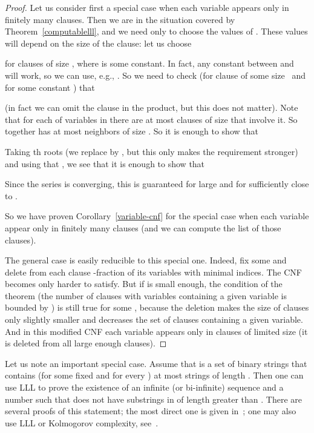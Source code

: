 \documentclass[12pt]{article}
\begin{document}
\begin{proof} Let us consider first a special case when each variable appears
only in finitely many clauses. Then we are in the situation covered by
Theorem~\ref{computablelll}, and we need only to choose the values of .
These values will depend on the size of the clause: let us choose
  
for clauses of size , where  is some constant. In fact, any constant
between  and  will work, so we can use, e.g., .
So we need to check (for clause  of some size~ and for some constant ) that
  
(in fact we can omit the clause  in the product, but this does not matter).
Note that for each of  variables in  there are at most 
clauses of size  that involve it. So together  has at most 
neighbors of size . So it is enough to show that
  
Taking th roots (we replace  by , but this only makes the requirement stronger) and using that , we see that it is enough
to show that
  
Since the series  is converging, this is
guaranteed for large  and for  sufficiently close to .

So we have proven Corollary~\ref{variable-cnf} for the special case when
each variable appear only in finitely many clauses (and we can compute
the list of those clauses).

The general case is easily reducible to this special one. Indeed, fix some  and delete from each clause -fraction of its variables with minimal indices. The CNF becomes only harder to satisfy. But if  is small enough, the condition of the theorem (the number of clauses with  variables containing a given variable is bounded by ) is still true for some , because the deletion makes the size of clauses only slightly smaller and decreases the set of clauses containing a given variable. And in this modified CNF each variable appears only in clauses of limited size (it is deleted from all large enough clauses).
\end{proof}

Let us note an important special case. Assume that  is a set of binary strings that contains (for some fixed  and for every ) at most  strings of length . Then one can use LLL to prove the existence of an infinite (or bi-infinite) sequence  and a number  such that  does not have substrings in  of length greater than . There are several proofs of this statement;  the most direct one is given in~\cite{miller-two-notes}; one may also use LLL or Kolmogorov complexity, see~\cite{rumyantsev-1,rumyantsev-2}.
\end{document}
